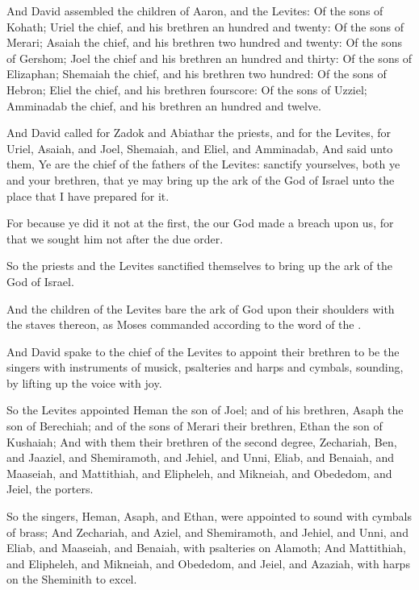 \verse And David assembled the children of Aaron, and the Levites: \verse Of the sons of Kohath; Uriel the chief, and his brethren an hundred and twenty: \verse Of the sons of Merari; Asaiah the chief, and his brethren two hundred and twenty: \verse Of the sons of Gershom; Joel the chief and his brethren an hundred and thirty: \verse Of the sons of Elizaphan; Shemaiah the chief, and his brethren two hundred: \verse Of the sons of Hebron; Eliel the chief, and his brethren fourscore: \verse Of the sons of Uzziel; Amminadab the chief, and his brethren an hundred and twelve.

\verse And David called for Zadok and Abiathar the priests, and for the Levites, for Uriel, Asaiah, and Joel, Shemaiah, and Eliel, and Amminadab, \verse And said unto them, Ye are the chief of the fathers of the Levites: sanctify yourselves, both ye and your brethren, that ye may bring up the ark of the \LORD God of Israel unto the place that I have prepared for it.

\verse For because ye did it not at the first, the \LORD our God made a breach upon us, for that we sought him not after the due order.

\verse So the priests and the Levites sanctified themselves to bring up the ark of the \LORD God of Israel.

\verse And the children of the Levites bare the ark of God upon their shoulders with the staves thereon, as Moses commanded according to the word of the \LORD.

\verse And David spake to the chief of the Levites to appoint their brethren to be the singers with instruments of musick, psalteries and harps and cymbals, sounding, by lifting up the voice with joy.

\verse So the Levites appointed Heman the son of Joel; and of his brethren, Asaph the son of Berechiah; and of the sons of Merari their brethren, Ethan the son of Kushaiah; \verse And with them their brethren of the second degree, Zechariah, Ben, and Jaaziel, and Shemiramoth, and Jehiel, and Unni, Eliab, and Benaiah, and Maaseiah, and Mattithiah, and Elipheleh, and Mikneiah, and Obededom, and Jeiel, the porters.

\verse So the singers, Heman, Asaph, and Ethan, were appointed to sound with cymbals of brass; \verse And Zechariah, and Aziel, and Shemiramoth, and Jehiel, and Unni, and Eliab, and Maaseiah, and Benaiah, with psalteries on Alamoth; \verse And Mattithiah, and Elipheleh, and Mikneiah, and Obededom, and Jeiel, and Azaziah, with harps on the Sheminith to excel.

